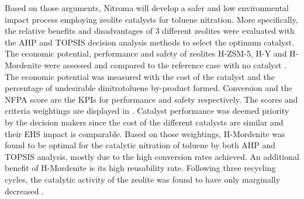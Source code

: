  Based on those arguments, Nitroma will develop a safer and low environmental impact process employing zeolite catalysts for toluene nitration. More specifically, the relative benefits and disadvantages of 3 different zeolites were evaluated with the AHP and TOPSIS decision analysis methods to select the optimum catalyst. The economic potential, performance and safety of zeolites H-ZSM-5, H-Y and H-Mordenite were assessed and compared to the reference case with no catalyst \cite{jeeru_kinetics_2018}. The economic potential was measured with the cost of the catalyst and the percentage of undesirable dinitrotoluene by-product formed. Conversion and the NFPA score are the KPIs for performance and safety respectively. The scores and criteria weightings are displayed in . Catalyst performance was deemed priority by the decision makers since the cost of the different catalysts are similar and their EHS impact is comparable. Based on those weightings, H-Mordenite was found to be optimal for the catalytic nitration of toluene by both AHP and TOPSIS analysis, mostly due to the high conversion rates achieved. An additional benefit of H-Mordenite is its high reusability rate. Following three recycling cycles, the catalytic activity of the zeolite was found to have only marginally decreased \cite{jeeru_kinetics_2018}. 


